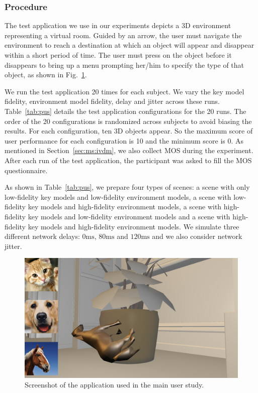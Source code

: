 \subsubsection{Procedure}

The test application we use in our experiments depicts a 3D environment representing a virtual room. Guided by an arrow, the user must navigate the environment to reach a destination at which an object will appear and disappear within a short period of time. The user must press on the object before it disappears to bring up a menu prompting her/him to specify the type of that object, as shown in Fig.~\ref{fig:us}.

We run the test application 20 times for each subject. We vary the key model fidelity, environment model fidelity, delay and jitter across these runs. Table~\ref{tab:pus} details the test application configurations for the 20 runs. The order of the 20 configurations is randomized across subjects to avoid biasing the results.
For each configuration, ten 3D objects appear. So the maximum score of user performance for each configuration is 10 and the minimum score is 0.
As mentioned in Section~\ref{sec:ms:ivdm}, we also collect MOS during the experiment. After each run of the test application, the participant was asked to fill the MOS questionnaire.

As shown in Table~\ref{tab:pus}, we prepare four types of scenes: a scene with only low-fidelity key models and low-fidelity environment models, a scene with low-fidelity key models and high-fidelity environment models, a scene with high-fidelity key models and low-fidelity environment models and a scene with high-fidelity key models and high-fidelity environment models. We simulate three different network delays: $0\mathrm{ms}$, $80\mathrm{ms}$ and $120\mathrm{ms}$ and we also consider network jitter.

\begin{figure}[!htbp]
	\includegraphics[width=\textwidth]{figures/user_study.png}
	\caption{Screenshot of the application used in the main user study.}
	\label{fig:us}
\end{figure}

